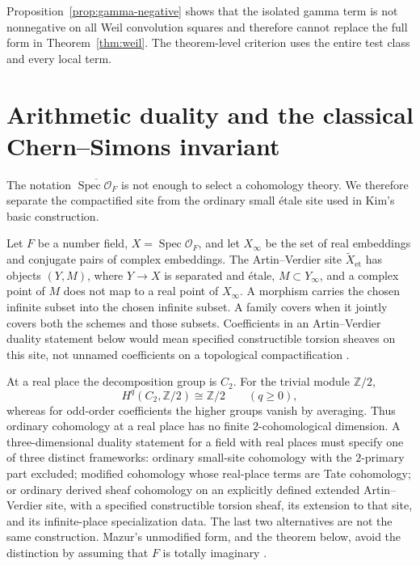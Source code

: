 \documentclass[11pt]{article}
\theoremstyle{plain}
\theoremstyle{definition}
\theoremstyle{remark}
\begin{document}
Proposition~\ref{prop:gamma-negative} shows that the isolated gamma term is
not nonnegative on all Weil convolution squares and therefore cannot replace
the full form in Theorem~\ref{thm:weil}.  The theorem-level criterion uses
the entire test class and every local term.

\section{Arithmetic duality and the classical Chern--Simons invariant}

The notation \(\overline{\operatorname{Spec}\mathcal O_F}\) is not enough
to select a cohomology theory.  We therefore separate the compactified site
from the ordinary small \'etale site used in Kim's basic construction.

Let \(F\) be a number field, \(X=\operatorname{Spec}\mathcal O_F\), and
let \(X_\infty\) be the set of real embeddings and conjugate pairs of
complex embeddings.  The Artin--Verdier site \(\widetilde X_{\mathrm{et}}\)
has objects \((Y,M)\), where \(Y\to X\) is separated and \'etale,
\(M\subset Y_\infty\), and a complex point of \(M\) does not map to a real
point of \(X_\infty\).  A morphism carries the chosen infinite subset into
the chosen infinite subset.  A family covers when it jointly covers both
the schemes and those subsets.  Coefficients in an Artin--Verdier duality
statement below would mean specified constructible torsion sheaves on this
site, not unnamed coefficients on a topological compactification
\cite[\S1]{Bienenfeld1987}.

At a real place the decomposition group is \(C_2\).  For the trivial
module \(\mathbb Z/2\),
\[
 H^q(C_2,\mathbb Z/2)\cong\mathbb Z/2\qquad(q\geq0),
\]
whereas for odd-order coefficients the higher groups vanish by averaging.
Thus ordinary cohomology at a real place has no finite
\(2\)-cohomological dimension.  A three-dimensional duality statement for
a field with real places must specify one of three distinct frameworks:
ordinary small-site cohomology with the \(2\)-primary part excluded;
modified cohomology whose real-place terms are Tate cohomology; or ordinary
derived sheaf cohomology on an explicitly defined extended
Artin--Verdier site, with a specified constructible torsion sheaf, its
extension to that site, and its infinite-place specialization data.  The
last two alternatives are not the same construction.  Mazur's unmodified
form, and the theorem below, avoid the distinction by assuming that \(F\)
is totally imaginary
\cite[\S2]{Mazur1973}.
\end{document}
